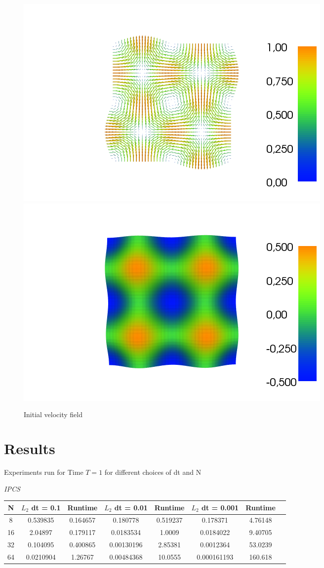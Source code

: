 \documentclass[a4paper,norsk]{article}
\begin{document}
\begin{figure}[h!]
	\centering
	\caption*{Initial velocity field}
	\includegraphics[scale=0.32]{2D/initial.png}
    \includegraphics[scale=0.32]{2D/initpress.png}
\end{figure}


\section*{Results}
Experiments run for Time $T = 1$ for different choices of dt and N

\textit{IPCS}
\begin{table}[ht]
\centering
\begin{tabular}{c|ccccccc}
\hline
\rowcolor{LightCyan}
N  &  $L_2$ dt = 0.1 & Runtime & $L_2$ dt = 0.01 & Runtime  & $L_2$ dt = 0.001  & Runtime\\
\hline
8 & 0.539835 & 0.164657 & 0.180778 & 0.519237 & 0.178371 & 4.76148 \\ \hline
\rowcolor{LightCyan}
16  & 2.04897  & 0.179117 &0.0183534&  1.0009 & 0.0184022 & 9.40705 \\ \hline
32 & 0.104095  & 0.400865 & 0.00130196 & 2.85381 & 0.0012364 & 53.0239 \\ \hline
\rowcolor{LightCyan}
64 &  0.0210904 &  1.26767 & 0.00484368 &10.0555  & 0.000161193 & 160.618\\
\hline
\end{tabular}
\end{table}
\end{document}
